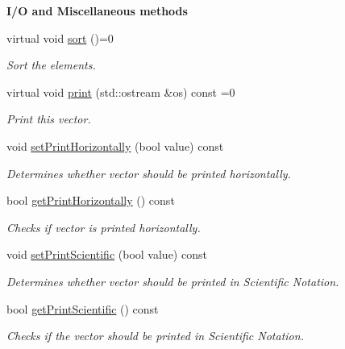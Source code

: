 \begin{Indent}{\bf I/\-O and Miscellaneous methods}\par
\begin{DoxyCompactItemize}
\item 
virtual void \hyperlink{class_q_u_e_s_o_1_1_vector_a57bec5bd73b41e301b9602c849f0e75f}{sort} ()=0
\begin{DoxyCompactList}\small\item\em Sort the elements. \end{DoxyCompactList}\item 
virtual void \hyperlink{class_q_u_e_s_o_1_1_vector_a7bd70a5181fbc2f20aaac46b0a9e3c72}{print} (std\-::ostream \&os) const =0
\begin{DoxyCompactList}\small\item\em Print this vector. \end{DoxyCompactList}\item 
void \hyperlink{class_q_u_e_s_o_1_1_vector_a993054e464a2626c35667c7c97bc9051}{set\-Print\-Horizontally} (bool value) const 
\begin{DoxyCompactList}\small\item\em Determines whether vector should be printed horizontally. \end{DoxyCompactList}\item 
bool \hyperlink{class_q_u_e_s_o_1_1_vector_abd1a972dac88eb02a6de8ec36d04a3ea}{get\-Print\-Horizontally} () const 
\begin{DoxyCompactList}\small\item\em Checks if vector is printed horizontally. \end{DoxyCompactList}\item 
void \hyperlink{class_q_u_e_s_o_1_1_vector_a7ac1d907a63659233d0fe24b3abafe68}{set\-Print\-Scientific} (bool value) const 
\begin{DoxyCompactList}\small\item\em Determines whether vector should be printed in Scientific Notation. \end{DoxyCompactList}\item 
bool \hyperlink{class_q_u_e_s_o_1_1_vector_a22b34a6d1ca3acce56054b5145bd83fe}{get\-Print\-Scientific} () const 
\begin{DoxyCompactList}\small\item\em Checks if the vector should be printed in Scientific Notation. \end{DoxyCompactList}\end{DoxyCompactItemize}
\end{Indent}
